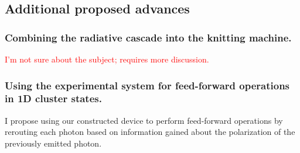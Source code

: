 \subsection{Additional proposed advances}
\subsubsection{Combining the radiative cascade into the knitting machine.}
\textcolor{red} {I'm not sure about the subject; requires more discussion. }
\subsubsection{Using the experimental system for feed-forward operations in 1D cluster states.}
I propose using our constructed device to perform feed-forward operations by rerouting each photon based on information gained about the polarization of the previously emitted photon. 

